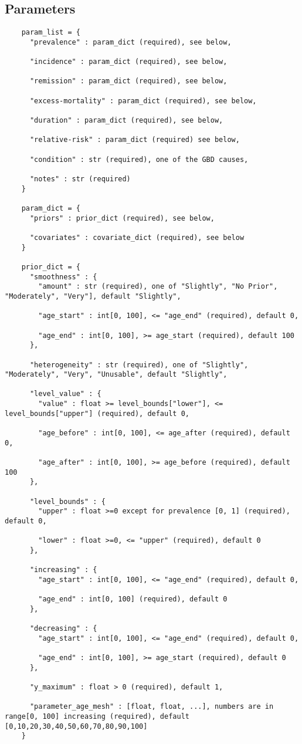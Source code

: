 \subsection{Parameters}
\begin{verbatim}
    param_list = {
      "prevalence" : param_dict (required), see below,

      "incidence" : param_dict (required), see below,

      "remission" : param_dict (required), see below,

      "excess-mortality" : param_dict (required), see below,

      "duration" : param_dict (required), see below,

      "relative-risk" : param_dict (required) see below,

      "condition" : str (required), one of the GBD causes,

      "notes" : str (required)
    }

    param_dict = {
      "priors" : prior_dict (required), see below,

      "covariates" : covariate_dict (required), see below
    }

    prior_dict = {
      "smoothness" : {
        "amount" : str (required), one of "Slightly", "No Prior", "Moderately", "Very"], default "Slightly",

        "age_start" : int[0, 100], <= "age_end" (required), default 0,

        "age_end" : int[0, 100], >= age_start (required), default 100
      },

      "heterogeneity" : str (required), one of "Slightly", "Moderately", "Very", "Unusable", default "Slightly",

      "level_value" : {
        "value" : float >= level_bounds["lower"], <= level_bounds["upper"] (required), default 0,

        "age_before" : int[0, 100], <= age_after (required), default 0,

        "age_after" : int[0, 100], >= age_before (required), default 100
      },

      "level_bounds" : {
        "upper" : float >=0 except for prevalence [0, 1] (required), default 0,

        "lower" : float >=0, <= "upper" (required), default 0
      },

      "increasing" : {
        "age_start" : int[0, 100], <= "age_end" (required), default 0,

        "age_end" : int[0, 100] (required), default 0
      },

      "decreasing" : {
        "age_start" : int[0, 100], <= "age_end" (required), default 0,

        "age_end" : int[0, 100], >= age_start (required), default 0
      },

      "y_maximum" : float > 0 (required), default 1,

      "parameter_age_mesh" : [float, float, ...], numbers are in range[0, 100] increasing (required), default [0,10,20,30,40,50,60,70,80,90,100]
    }
\end{verbatim}

